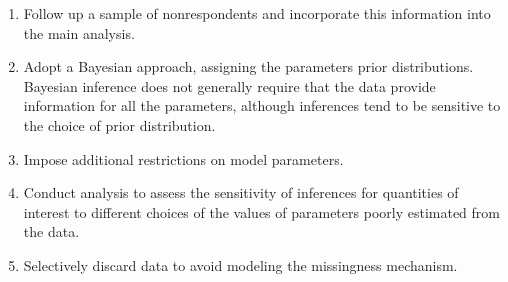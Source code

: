 \begin{enumerate}
	\item Follow up a sample of nonrespondents and incorporate this information into the main analysis.
	\item Adopt a Bayesian approach, assigning the parameters prior distributions. Bayesian inference does not generally require that the data provide information for all the parameters, although inferences tend to be sensitive to
	      the choice of prior distribution.
	\item Impose additional restrictions on model parameters.
	\item Conduct analysis to assess the sensitivity of inferences for quantities of interest to different choices of the values of parameters poorly estimated from the data.
	\item Selectively discard data to avoid modeling the missingness mechanism.
\end{enumerate}
